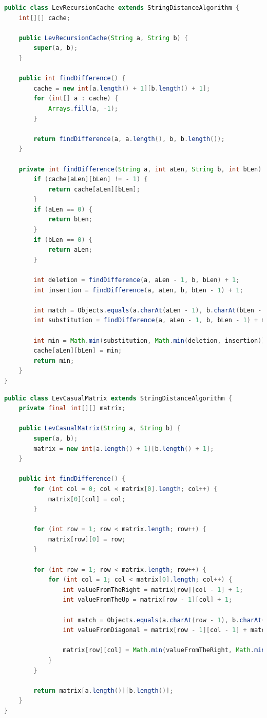 \documentclass[12pt]{report}
\begin{document}
    \begin{lstlisting}[label=code:levRecurMatrix,caption=Метод для нахождения расстояния Левенштейна рекурсивно
    \(\text{с матрицей}\),language=java]
public class LevRecursionCache extends StringDistanceAlgorithm {
    int[][] cache;

    public LevRecursionCache(String a, String b) {
        super(a, b);
    }

    public int findDifference() {
        cache = new int[a.length() + 1][b.length() + 1];
        for (int[] a : cache) {
            Arrays.fill(a, -1);
        }

        return findDifference(a, a.length(), b, b.length());
    }

    private int findDifference(String a, int aLen, String b, int bLen) {
        if (cache[aLen][bLen] != - 1) {
            return cache[aLen][bLen];
        }
        if (aLen == 0) {
            return bLen;
        }
        if (bLen == 0) {
            return aLen;
        }

        int deletion = findDifference(a, aLen - 1, b, bLen) + 1;
        int insertion = findDifference(a, aLen, b, bLen - 1) + 1;

        int match = Objects.equals(a.charAt(aLen - 1), b.charAt(bLen - 1)) ? 0 : 1;
        int substitution = findDifference(a, aLen - 1, b, bLen - 1) + match;

        int min = Math.min(substitution, Math.min(deletion, insertion));
        cache[aLen][bLen] = min;
        return min;
    }
}
    \end{lstlisting}

    \begin{lstlisting}[label=code:levСasualMatrix,caption=Метод для нахождения расстояния Левенштейна итерационно,
        language=java]
public class LevCasualMatrix extends StringDistanceAlgorithm {
    private final int[][] matrix;

    public LevCasualMatrix(String a, String b) {
        super(a, b);
        matrix = new int[a.length() + 1][b.length() + 1];
    }

    public int findDifference() {
        for (int col = 0; col < matrix[0].length; col++) {
            matrix[0][col] = col;
        }

        for (int row = 1; row < matrix.length; row++) {
            matrix[row][0] = row;
        }

        for (int row = 1; row < matrix.length; row++) {
            for (int col = 1; col < matrix[0].length; col++) {
                int valueFromTheRight = matrix[row][col - 1] + 1;
                int valueFromTheUp = matrix[row - 1][col] + 1;

                int match = Objects.equals(a.charAt(row - 1), b.charAt(col - 1)) ? 0 : 1;
                int valueFromDiagonal = matrix[row - 1][col - 1] + match;

                matrix[row][col] = Math.min(valueFromTheRight, Math.min(valueFromTheUp, valueFromDiagonal));
            }
        }

        return matrix[a.length()][b.length()];
    }
}
    \end{lstlisting}
\end{document}
